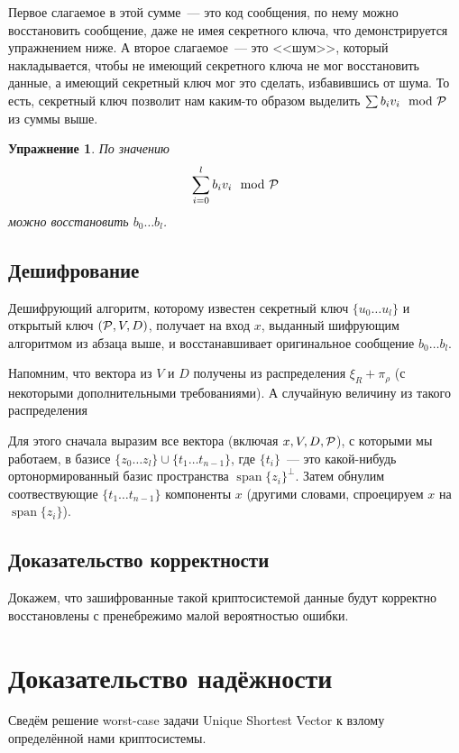 \documentclass[oneside, a4paper]{article}
\theoremstyle{plain}
\newtheorem{exce}{Упражнение}
\theoremstyle{definition}
\theoremstyle{remark}
\DeclareMathOperator{\Span}{span}
\newcommand\PP{\ensuremath \mathcal P}
\begin{document}
Первое слагаемое в этой сумме~--- это код сообщения, по нему можно восстановить
сообщение, даже не имея секретного ключа, что демонстрируется упражнением ниже.
А второе слагаемое~--- это <<шум>>, который накладывается, чтобы не имеющий
секретного ключа не мог восстановить данные, а имеющий секретный ключ мог это
сделать, избавившись от шума. То есть, секретный ключ позволит нам каким-то
образом выделить $\sum b_i v_i \mod \PP$ из суммы выше.

\begin{exce}
По значению
\[
\sum_{i=0}^l b_i v_i \mod \PP
\]
можно восстановить $b_0 \dots b_l$.
\end{exce}

\subsection{Дешифрование} Дешифрующий алгоритм, которому известен секретный ключ
$\{u_0 \dots u_l\}$ и открытый ключ $(\PP, V, D)$, получает на вход $x$,
выданный шифрующим алгоритмом из абзаца выше, и восстанавшивает оригинальное
сообщение $b_0 \dots b_l$.

Напомним, что вектора из $V$ и $D$ получены из распределения $\xi_R + \pi_\rho$
(с некоторыми дополнительными требованиями). А случайную величину из такого
распределения 

Для этого сначала выразим все вектора (включая $x, V, D, \PP$), с которыми мы
работаем, в базисе $\{ z_0 \dots z_l \} \cup \{t_1 \dots t_{n-1}\}$, где
$\{t_i\}$~--- это какой-нибудь ортонормированный базис пространства $\Span
\{z_i\}^\bot$. Затем обнулим соотвествующие $\{t_1 \dots t_{n-1}\}$ компоненты
$x$ (другими словами, спроецируем $x$ на $\Span \{z_i\}$).

\subsection{Доказательство корректности}
Докажем, что зашифрованные такой криптосистемой данные будут корректно
восстановлены с пренебрежимо малой вероятностью ошибки.

\section{Доказательство надёжности}
Сведём решение \foreignlanguage{english}{worst-case} задачи
\foreignlanguage{english}{Unique Shortest Vector} к взлому определённой нами
криптосистемы.
\end{document}
